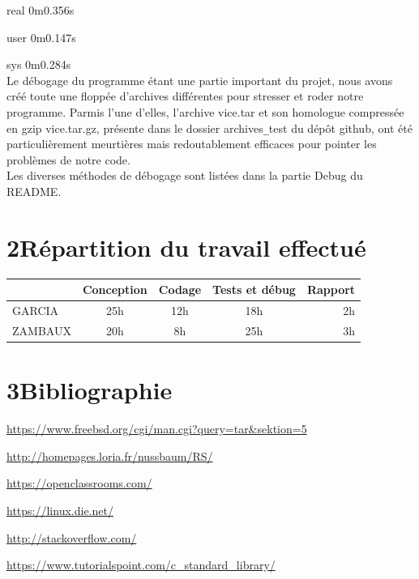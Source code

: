 \documentclass[12pt, a4paper]{report}
\begin{document}
\hspace{1.5cm}	real	0m0.356s

\hspace{1.5cm}	user	0m0.147s

\hspace{1.5cm}	sys	0m0.284s
\\
\hspace{0.5cm}Le débogage du programme étant une partie important du projet, nous avons créé toute une floppée d'archives différentes pour stresser et roder notre programme. Parmis l'une d'elles, l'archive vice.tar et son homologue compressée en gzip vice.tar.gz, présente dans le dossier archives\verb|_|test du dépôt github, ont été particulièrement meurtières mais redoutablement efficaces pour pointer les problèmes de notre code.\\

\hspace{0.5cm}Les diverses méthodes de débogage sont listées dans la partie Debug du README.

\chapter*{2\hspace{1cm}Répartition du travail effectué}

\begin{tabular}{|l|c|c|c|r|}
  \hline
  &Conception & Codage & Tests et débug & Rapport \\
  \hline
  GARCIA & 25h & 12h & 18h & 2h\\
  ZAMBAUX & 20h & 8h & 25h & 3h\\
  \hline
\end{tabular}


\chapter*{3\hspace{1cm}Bibliographie}


\hspace{0.6cm}\url{https://www.freebsd.org/cgi/man.cgi?query=tar&sektion=5}

\url{http://homepages.loria.fr/nussbaum/RS/}

\url{https://openclassrooms.com/}

\url{https://linux.die.net/}

\url{http://stackoverflow.com/}

\url{https://www.tutorialspoint.com/c_standard_library/}
\end{document}
